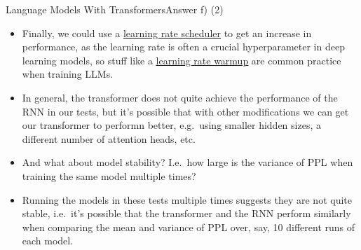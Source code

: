 \documentclass[t]{beamer}
\begin{document}
\begin{frame}{Language Models With Transformers}{Answer f) (2)}
    \begin{itemize}
        \item Finally, we could use a
              \href{https://machinelearningmastery.com/using-learning-rate-schedule-in-pytorch-training/}{\underline{learning rate scheduler}}
              to get an increase in performance, as the learning rate is often a
              crucial hyperparameter in deep learning models, so stuff like
              a \href{https://www.baeldung.com/cs/learning-rate-warm-up}{\underline{learning rate warmup}}
              are common practice when training LLMs.
        \item In general, the transformer does not quite achieve the performance
              of the RNN in our tests, but it's possible that with other
              modifications we can get our transformer to performn better, e.g.\
              using smaller hidden sizes, a different number of attention heads,
              etc.
        \item And what about model stability? I.e.\ how large is
              the variance of PPL when training the same model multiple times?
        \item Running the models in these tests multiple times suggests they are
              not quite stable, i.e.\ it's possible that the
              transformer and the RNN perform similarly when comparing the mean
              and variance of PPL over, say, 10 different runs of each model.
    \end{itemize}
\end{frame}
\end{document}
